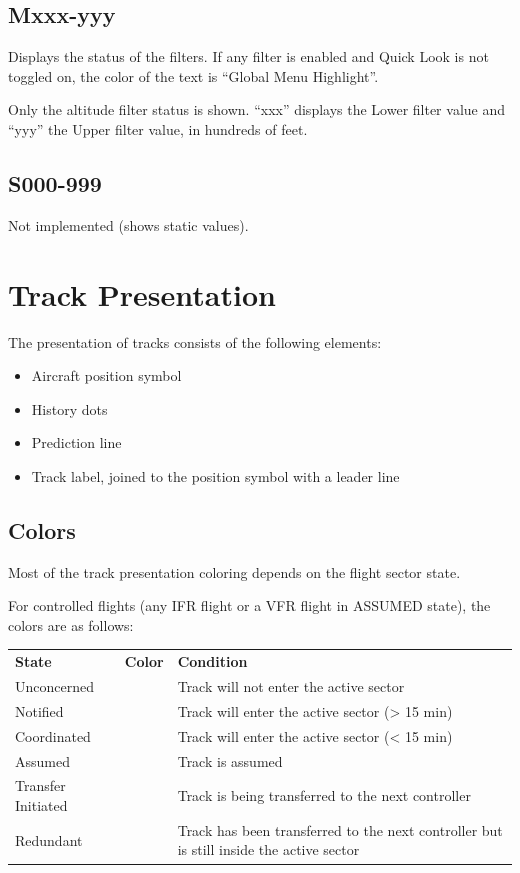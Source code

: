 \documentclass[11pt,a4paper]{memoir}
\newcommand{\colorref}[1]{\textit{\hyperref[#1]{\StrDel{#1}{color:}}}}
\begin{document}
\subsection{Mxxx-yyy}
\label{menu:mfil}

Displays the status of the filters. If any filter is enabled and Quick Look is not toggled on, the color of the text is “Global Menu Highlight”.

Only the altitude filter status is shown. “xxx” displays the Lower filter value and “yyy” the Upper filter value, in hundreds of feet.

\subsection{S000-999}
Not implemented (shows static values).

\section{Track Presentation}

The presentation of tracks consists of the following elements:

\begin{itemize}
    \item{Aircraft position symbol}
    \item{History dots}
    \item{Prediction line}
    \item{Track label, joined to the position symbol with a leader line}
\end{itemize}

\subsection{Colors}

Most of the track presentation coloring depends on the flight sector state.

For controlled flights (any IFR flight or a VFR flight in ASSUMED state), the colors are as follows:

\begin{tabular}{l l l}
\textbf{State}          & \textbf{Color}    & \textbf{Condition}\\
Unconcerned           & \colorref{color:Unconcerned}     & Track will not enter the active sector\\
Notified              & \colorref{color:Concerned}       & Track will enter the active sector (> 15 min)\\
Coordinated           & \colorref{color:Coordination}    & Track will enter the active sector (< 15 min)\\
Assumed               & \colorref{color:Assumed}         & Track is assumed\\
Transfer Initiated    & \colorref{color:Assumed}         & Track is being transferred to the next controller\\
Redundant             & \colorref{color:Redundant}       & Track has been transferred to the next controller but is still inside the active sector\\
\end{tabular}
\end{document}
